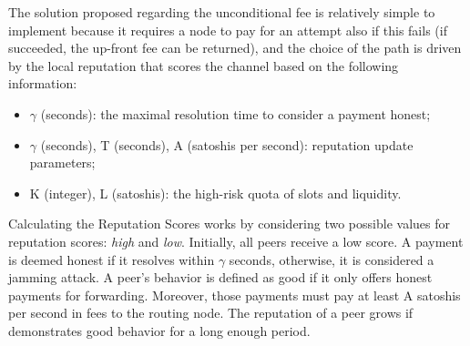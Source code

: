 The solution proposed regarding the unconditional fee is relatively simple to implement 
because it requires a node to pay for an attempt also if this fails (if succeeded, the up-front fee can 
be returned), and the choice of the path is driven by the local reputation that 
scores the channel based on the following information:

\begin{itemize}
    \item  $\gamma$ (seconds): the maximal resolution time to consider a payment honest;
    \item  $\gamma$  (seconds), T (seconds), A (satoshis per second): reputation update 
    parameters;
    \item  K (integer), L (satoshis): the high-risk quota of slots and liquidity.
\end{itemize}


Calculating the Reputation Scores works by considering two possible values
for reputation scores:  \emph{high}  and  \emph{low}. Initially, all peers 
receive a low score. A payment is deemed  honest  if it resolves within  
$\gamma$  seconds, otherwise, it is considered a jamming attack. 
A peer’s behavior is defined as  good  if it only offers honest payments 
for forwarding. Moreover, those payments must pay at least A satoshis 
per second in fees to the routing node. The reputation of a peer grows if 
demonstrates good behavior for a long enough period.

